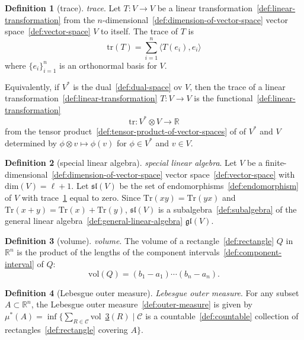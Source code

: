 \documentclass[12pt,a4paper]{article}
\theoremstyle{definition}
\newtheorem{definition}{Definition}
\begin{document}
\begin{definition}[trace]\label{def:trace}
\emph{trace}. Let $T:V\to V$ be a linear transformation~\ref{def:linear-transformation} from the $n$-dimensional~\ref{def:dimension-of-vector-space} vector space~\ref{def:vector-space} $V$ to itself. The trace of $T$ is $$\text{tr}(T) = \sum_{i=1}^n \langle T(e_i), e_i\rangle$$ where $\{e_i\}_{i=1}^n$ is an orthonormal basis for $V$.

Equivalently, if $V^*$ is the dual~\ref{def:dual-space} ov $V$, then the trace of a linear transformation~\ref{def:linear-transformation} $T: V\to V$ is the functional~\ref{def:linear-transformation} $$\text{tr}:V^*\otimes V \to \mathbb R$$ from the tensor product~\ref{def:tensor-product-of-vector-spaces} of of $V^*$ and $V$ determined by $\phi \otimes v \mapsto \phi(v)$ for $\phi \in V^*$ and $v \in V$.
\end{definition}

\begin{definition}[special linear algebra]\label{def:special-linear-algebra}
\emph{special linear algebra}. Let $V$ be a finite-dimensional~\ref{def:dimension-of-vector-space} vector space~\ref{def:vector-space} with $\text{dim}(V) = \ell +1$. Let $\mathfrak{sl}(V)$ be the set of endomorphisms~\ref{def:endomorphism} of $V$ with trace~\ref{def:trace} equal to zero. Since $\text{Tr}(xy)= \text{Tr}(yx)$ and $\text{Tr}(x+y) =\text{Tr}(x)+\text{Tr}(y)$, $\mathfrak{sl}(V)$ is a subalgebra~\ref{def:subalgebra} of the general linear algebra~\ref{def:general-linear-algebra} $\mathfrak{gl}(V)$.
\end{definition}

\begin{definition}[volume]\label{def:volume}
\emph{volume}. The volume of a rectangle~\ref{def:rectangle} $Q$ in $\mathbb R^n$ is the product of the lengths of the component intervals~\ref{def:component-interval} of $Q$: $$\text{vol}(Q) = (b_1-a_1)\cdots(b_n-a_n).$$
\end{definition}

\begin{definition}[Lebesgue outer measure]\label{def:lebesgue-outer-measure}
\emph{Lebesgue outer measure}. For any subset $A \subset\mathbb R^n$, the Lebesgue outer measure~\ref{def:outer-measure} is given by $\mu^*(A) = \inf\{\sum\limits_{R\in\mathcal C}$vol~\ref{def:volume}$(R) \mid \mathcal C$ is a countable~\ref{def:countable} collection of rectangles~\ref{def:rectangle} covering $A\}$.
\end{definition}
\end{document}
